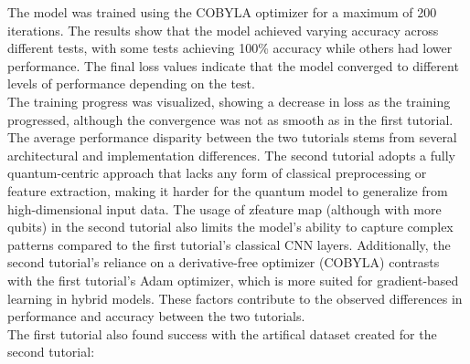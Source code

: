 \documentclass[conference]{IEEEtran}
\begin{document}
\begin{table}[ht]
\centering
{}
\caption{accuracy and final loss of the tests}
\end{table}

\noindent
The model was trained using the COBYLA optimizer for a maximum of 200 iterations.
The results show that the model achieved varying accuracy across different tests, with some tests achieving 100\% accuracy while others had lower performance. The final loss values indicate that the model converged to different levels of performance depending on the test.\\
The training progress was visualized, showing a decrease in loss as the training progressed, although the convergence was not as smooth as in the first tutorial.\\


The average performance disparity between the two tutorials stems from several architectural and implementation differences. The second tutorial adopts a fully quantum-centric approach that lacks any form of classical preprocessing or feature extraction, making it harder for the quantum model to generalize from high-dimensional input data. The usage of zfeature map (although with more qubits) in the second tutorial also limits the model's ability to capture complex patterns compared to the first tutorial's classical CNN layers. Additionally, the second tutorial's reliance on a derivative-free optimizer (COBYLA) contrasts with the first tutorial's Adam optimizer, which is more suited for gradient-based learning in hybrid models. These factors contribute to the observed differences in performance and accuracy between the two tutorials.\\


\noindent
The first tutorial also found success with the artifical dataset created for the second tutorial:
\end{document}
